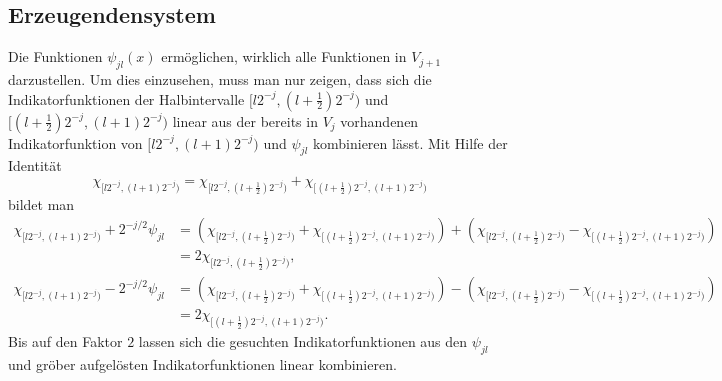 \subsection{Erzeugendensystem}
Die Funktionen $\psi_{jl}(x)$ ermöglichen, wirklich alle Funktionen
in $V_{j+1}$ darzustellen.
Um dies einzusehen, muss man nur zeigen, dass sich die Indikatorfunktionen
der Halbintervalle $[l2^{-j},(l+\frac12)2^{-j})$ und
$[(l+\frac12)2^{-j},(l+1)2^{-j})$ linear aus der bereits in $V_j$ vorhandenen
Indikatorfunktion von $[l2^{-j},(l+1)2^{-j})$ und $\psi_{jl}$
kombinieren lässt.
Mit Hilfe der Identität
\[
\chi_{[l2^{-j},(l+1)2^{-j})}
=
\chi_{[l2^{-j},(l+\frac12)2^{-j})}
+
\chi_{[(l+\frac12)2^{-j},(l+1)2^{-j})}
\]
bildet man
\begin{align*}
\chi_{[l2^{-j},(l+1)2^{-j})}
+
2^{-j/2}\psi_{jl}
&=
(
\chi_{[l2^{-j},(l+\frac12)2^{-j})}
+
\chi_{[(l+\frac12)2^{-j},(l+1)2^{-j})}
)
+
(
\chi_{[l2^{-j},(l+\frac12)2^{-j})}
-
\chi_{[(l+\frac12)2^{-j},(l+1)2^{-j})}
)
\\
&=
2
\chi_{[l2^{-j},(l+\frac12)2^{-j})},
\\
\chi_{[l2^{-j},(l+1)2^{-j})}
-
2^{-j/2}\psi_{jl}
&=
(
\chi_{[l2^{-j},(l+\frac12)2^{-j})}
+
\chi_{[(l+\frac12)2^{-j},(l+1)2^{-j})}
)
-
(
\chi_{[l2^{-j},(l+\frac12)2^{-j})}
-
\chi_{[(l+\frac12)2^{-j},(l+1)2^{-j})}
)
\\
&=
2\chi_{[(l+\frac12)2^{-j},(l+1)2^{-j})}.
\end{align*}
Bis auf den Faktor $2$ lassen sich die gesuchten Indikatorfunktionen
aus den $\psi_{jl}$ und gröber aufgelösten Indikatorfunktionen linear
kombinieren.


